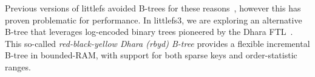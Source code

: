 \documentclass[letterpaper,twocolumn,10pt]{article}
\def\lfs+{littlefs}
\def\lfsiii+{avianfs}
\def\lfsiii+{littlefs3}
\begin{document}

Previous versions of \lfs+ avoided B-trees for these reasons~\cite{littlefs2},
however this has proven problematic for performance.
In \lfsiii+, we are exploring an alternative B-tree that leverages
log-encoded binary trees pioneered by the Dhara FTL~\cite{dhara}.
This so-called
\emph{red-black-yellow Dhara (rbyd) B-tree}
provides a
flexible incremental B-tree in bounded-RAM,
with support for both sparse keys and order-statistic ranges.
\end{document}

